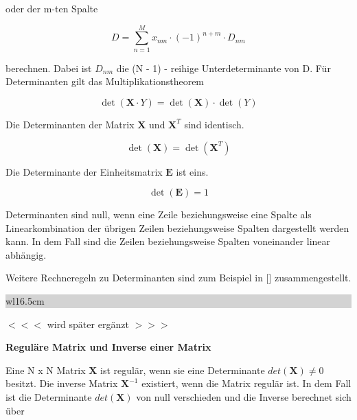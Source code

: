 \noindent oder der m-ten Spalte 

\begin{equation}\label{eq:thirteenonehundredthree}
D=\sum _{n=1}^{M}x_{nm} \cdot (-1)^{n+m} \cdot D_{nm}
\end{equation}

\noindent berechnen. Dabei ist $D_{nm}$ die (N - 1) - reihige Unterdeterminante von D. F\"{u}r Determinanten gilt das Multiplikationstheorem 

\begin{equation}\label{eq:thirteenonehundredfour}
\det (\mathbf{X}\cdot Y)=\det (\mathbf{X})\cdot \det (Y)
\end{equation}

\noindent Die Determinanten der Matrix $\mathbf{X}$ und $\mathbf{X}^{T}$ sind identisch.

\begin{equation}\label{eq:thirteenonehundredfive}
\det (\mathbf{X})=\det \left(\mathbf{X}^{T} \right)
\end{equation}

\noindent Die Determinante der Einheitsmatrix $\mathbf{E}$ ist eins.

\begin{equation}\label{eq:thirteenonehundredsix}
\det (\mathbf{E})=1
\end{equation}

\noindent Determinanten sind null, wenn eine Zeile beziehungsweise eine Spalte als Linearkombination der \"{u}brigen Zeilen beziehungsweise Spalten dargestellt werden kann. In dem Fall sind die Zeilen beziehungsweise Spalten voneinander linear abh\"{a}ngig.\newline

\noindent Weitere Rechneregeln zu Determinanten sind zum Beispiel in [] zusammengestellt.\bigskip

\noindent
\colorbox{lightgray}{%
%
\renewcommand\arraystretch{0.6}%
\begin{tabular}{ wl{16.5cm} }
{\selectfont
{}}
\end{tabular}%
}\medskip

\noindent $<<<$ wird sp\"{a}ter erg\"{a}nzt $>>>$\bigskip

\selectfont
\noindent\textbf{Regul\"{a}re Matrix und Inverse einer Matrix } \smallskip

\noindent Eine N x N Matrix $\mathbf{X}$ ist regul\"{a}r, wenn sie eine Determinante $det(\mathbf{X}) \neq 0$ besitzt. Die inverse Matrix $\mathbf{X}^{-1}$ existiert, wenn die Matrix regul\"{a}r ist. In dem Fall ist die Determinante $det(\mathbf{X})$ von null verschieden und die Inverse berechnet sich \"{u}ber 

